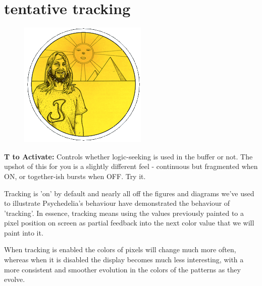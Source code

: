 \section*{tentative tracking} 
\label{sec:tracking}
\lstset{style=6502Style}
\lstset{ 
   aboveskip=5pt,
   belowskip=0pt,
}

\begin{definition}
\setlength{\intextsep}{0pt}%
\setlength{\columnsep}{3pt}%
\begin{figure}
\includegraphics[width=\linewidth]{src/callout/psych.png} 
\end{figure}
\small
\textbf{T to Activate:} Controls whether logic-seeking is used in
the buffer or not. The upshot of this for you is a slightly different
feel - continuous but fragmented when ON, or together-ish bursts
when OFF. Try it.
\\
\end{definition}

Tracking is 'on' by default and nearly all off the figures and diagrams we've used to illustrate
Psychedelia's behaviour have demonstrated the behaviour of 'tracking'. In essence, tracking means
using the values previously painted to a pixel position on screen as partial feedback into the next
color value that we will paint into it. 

When tracking is enabled the colors of pixels will change much more often, whereas when it is disabled
the display becomes much less interesting, with a more consistent and smoother evolution in the colors
of the patterns as they evolve.

